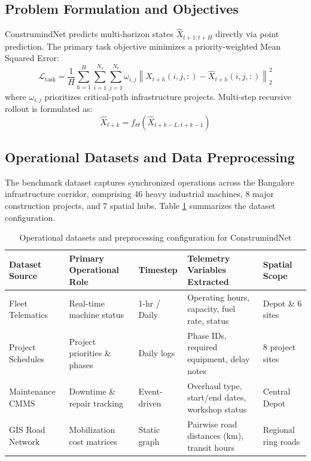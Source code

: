 \documentclass[11pt,a4paper]{article}
\begin{document}
\subsection{Problem Formulation and Objectives}
ConstrumindNet predicts multi-horizon states $\widehat{X}_{t+1:t+H}$ directly via point prediction. The primary task objective minimizes a priority-weighted Mean Squared Error:
\begin{equation}
\mathcal{L}_{\text{task}} = \frac{1}{H} \sum_{h=1}^H \sum_{i=1}^{N_s} \sum_{j=1}^{N_e} \omega_{i, j} \left\| X_{t+h}(i, j, :) - \widehat{X}_{t+h}(i, j, :) \right\|_2^2 \label{eq:task_loss}
\end{equation}
where $\omega_{i, j}$ prioritizes critical-path infrastructure projects. Multi-step recursive rollout is formulated as:
\begin{equation}
\widehat{X}_{t+k} = f_\Theta\left(\widehat{X}_{t+k-L:t+k-1}\right) \label{eq:rollout}
\end{equation}

\subsection{Operational Datasets and Data Preprocessing}
The benchmark dataset captures synchronized operations across the Bangalore infrastructure corridor, comprising 46 heavy industrial machines, 8 major construction projects, and 7 spatial hubs. Table \ref{tab:datasets} summarizes the dataset configuration.

\begin{table}[t]
\centering
\small
\caption{Operational datasets and preprocessing configuration for ConstrumindNet}\label{tab:datasets}
\begin{tabularx}{\textwidth}{l p{3.5cm} l X l}
\toprule
\textbf{Dataset Source} & \textbf{Primary Operational Role} & \textbf{Timestep} & \textbf{Telemetry Variables Extracted} & \textbf{Spatial Scope} \\
\midrule
Fleet Telematics & Real-time machine status & 1-hr / Daily & Operating hours, capacity, fuel rate, status & Depot \& 6 sites \\
Project Schedules & Project priorities \& phases & Daily logs & Phase IDs, required equipment, delay notes & 8 project sites \\
Maintenance CMMS & Downtime \& repair tracking & Event-driven & Overhaul type, start/end dates, workshop status & Central Depot \\
GIS Road Network & Mobilization cost matrices & Static graph & Pairwise road distances (km), transit hours & Regional ring roads \\
\bottomrule
\end{tabularx}
\end{table}
\end{document}
